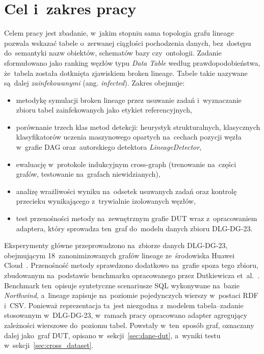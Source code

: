 \documentclass[polish,master,a4paper,oneside]{ppfcmthesis}
\renewcommand{\_}{\origtextunderscore\ifmmode\else\allowbreak\fi}
\begin{document}
\section{Cel i~zakres pracy}

Celem pracy jest zbadanie, w~jakim stopniu sama topologia grafu lineage
pozwala wskazać tabele o~zerwanej ciągłości pochodzenia danych, bez~dostępu
do~semantyki nazw obiektów, schematów bazy czy~ontologii. Zadanie sformułowano
jako ranking węzłów typu \emph{Data Table} według prawdopodobieństwa,
że~tabela została dotknięta zjawiskiem broken lineage. Tabele takie
nazywane są~dalej \emph{zainfekowanymi} (ang. \emph{infected}).
Zakres obejmuje:

\begin{itemize}
  \item metodykę symulacji broken lineage przez usuwanie zadań
        i~wyznaczanie zbioru tabel zainfekowanych jako etykiet referencyjnych,
  \item porównanie trzech klas metod detekcji: heurystyk strukturalnych,
        klasycznych klasyfikatorów uczenia maszynowego opartych na~cechach
        pozycji węzła w~grafie DAG oraz~autorskiego detektora
        \emph{LineageDetector},
  \item ewaluację w~protokole indukcyjnym cross-graph (trenowanie
        na~części grafów, testowanie na~grafach niewidzianych),
  \item analizę wrażliwości wyniku na~odsetek usuwanych zadań oraz kontrolę
        przecieku wynikającego z~trywialnie izolowanych węzłów,
  \item test przenośności metody na~zewnętrznym grafie DUT wraz
        z~opracowaniem adaptera, który sprowadza ten~graf do~modelu danych
        zbioru DLG-DG-23.
\end{itemize}

Eksperymenty główne przeprowadzono na~zbiorze danych DLG-DG-23, obejmującym
18~zanonimizowanych grafów lineage ze~środowiska Huawei Cloud~\cite{Chen2024}.
Przenośność metody sprawdzono dodatkowo na~grafie spoza tego zbioru,
zbudowanym na~podstawie benchmarku opracowanego przez Dutkiewicza
et~al.~\cite{Dutkiewicz2026}. Benchmark ten~opisuje syntetyczne scenariusze
SQL wykonywane na~bazie \emph{Northwind}, a~lineage zapisuje na~poziomie
pojedynczych wierszy w~postaci RDF i~CSV. Ponieważ reprezentacja ta~jest
niezgodna z~modelem tabela–zadanie stosowanym w~DLG-DG-23, w~ramach pracy
opracowano adapter agregujący zależności wierszowe do~poziomu tabel. Powstały
w~ten~sposób graf, oznaczany dalej jako~graf DUT, opisano
w~sekcji~\ref{sec:dane-dut}, a~wyniki testu w~sekcji~\ref{sec:cross_dataset}.
\end{document}
